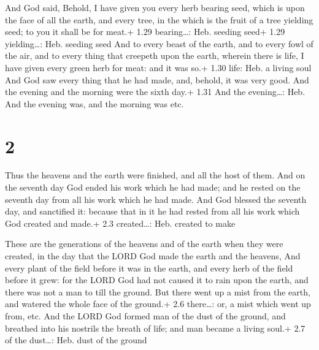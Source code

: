  And God said, Behold, I have given you every herb
bearing seed, which is upon the face of all the earth, and every tree,
in the which is the fruit of a tree yielding seed; to you it shall be
for meat.+ 1.29 bearing\ldots: Heb. seeding seed+ 1.29 yielding\ldots:
Heb. seeding seed  And to every beast of the earth, and to
every fowl of the air, and to every thing that creepeth upon the earth,
wherein there is life, I have given every green herb for meat: and it
was so.+ 1.30 life: Heb. a living soul  And God saw every
thing that he had made, and, behold, it was very good. And the evening
and the morning were the sixth day.+ 1.31 And the evening\ldots: Heb.
And the evening was, and the morning was etc.

\hypertarget{section-1}{%
\section{2}\label{section-1}}

 Thus the heavens and the earth were finished, and all the
host of them.  And on the seventh day God ended his work
which he had made; and he rested on the seventh day from all his work
which he had made.  And God blessed the seventh day, and
sanctified it: because that in it he had rested from all his work which
God created and made.+ 2.3 created\ldots: Heb. created to make

 These are the generations of the heavens and of the earth
when they were created, in the day that the LORD God made the earth and
the heavens,  And every plant of the field before it was in
the earth, and every herb of the field before it grew: for the LORD God
had not caused it to rain upon the earth, and there was not a man to
till the ground.  But there went up a mist from the earth,
and watered the whole face of the ground.+ 2.6 there\ldots: or, a mist
which went up from, etc.  And the LORD God formed man of the
dust of the ground, and breathed into his nostrils the breath of life;
and man became a living soul.+ 2.7 of the dust\ldots: Heb. dust of the
ground

